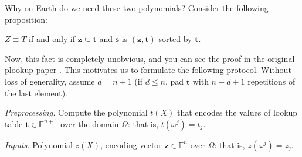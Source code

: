 \documentclass[../../book]{subfiles}
\begin{document}
Why on Earth do we need these two polynomials? Consider the following
proposition:

\begin{proposition}
    $Z \equiv T$ if and only if $\boldsymbol{z} \subseteq \boldsymbol{t}$ and
    $\boldsymbol{s}$ is $(\boldsymbol{z},\boldsymbol{t})$ sorted by
    $\boldsymbol{t}$.
\end{proposition}

Now, this fact is completely unobvious, and you can see the proof in the
original plookup paper \cite{plookup}. This
motivates us to formulate the following protocol. Without loss of generality,
assume $d=n+1$ (if $d \leq n$, pad $\boldsymbol{t}$ with $n-d+1$ repetitions of
the last element).

\textit{Preprocessing.} Compute the polynomial $t(X)$ that encodes the values of
lookup table $\boldsymbol{t} \in \mathbb{F}^{n+1}$ over the domain $\Omega$:
that is, $t(\omega^j)=t_j$. 

\textit{Inputs.} Polynomial $z(X)$, encoding vector $\boldsymbol{z} \in
\mathbb{F}^n$ over $\Omega$: that is, $z(\omega^j) = z_j$.
\end{document}
